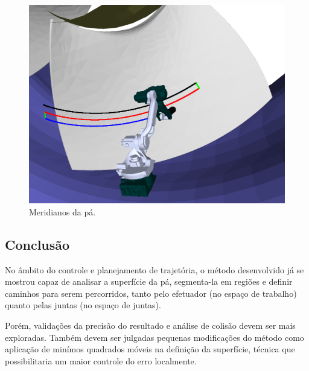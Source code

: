 \begin{figure}[!ht]
	\centering
	\includegraphics[width=0.7\columnwidth]{method/figs/planejamento/meridianos.png}
	\caption{Meridianos da pá.}
	\label{fig::meridianos}
\end{figure}

\subsection{Conclusão}

No âmbito do controle e planejamento de trajetória, o método desenvolvido já se
mostrou capaz de analisar a superfície da pá, segmenta-la em regiões e definir
caminhos para serem percorridos, tanto pelo efetuador (no espaço de trabalho)
quanto pelas juntas (no espaço de juntas).

Porém, validações da precisão do resultado e análise de colisão devem ser mais
exploradas. Também devem ser julgadas pequenas modificações do método como
aplicação de minímos quadrados móveis na definição da superfície, técnica 
que possibilitaria um maior controle do erro localmente.